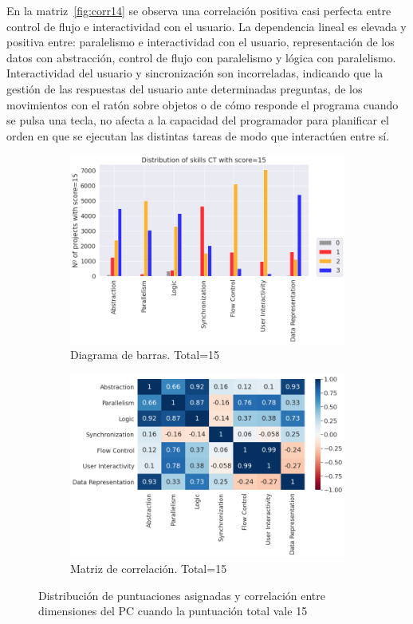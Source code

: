 \documentclass[a4paper, 12pt]{book}
\begin{document}
En la matriz~\ref{fig:corr14} se observa una correlación positiva casi perfecta entre control de flujo e interactividad con el usuario. La dependencia lineal es elevada y positiva entre: paralelismo e interactividad con el usuario, representación de los datos con abstracción, control de flujo con paralelismo y lógica con paralelismo. Interactividad del usuario y sincronización son incorreladas, indicando que la gestión de las respuestas del usuario ante determinadas preguntas, de los movimientos con el ratón sobre objetos o de cómo responde el programa cuando se pulsa una tecla, no afecta a la capacidad del programador para planificar el orden en que se ejecutan las distintas tareas de modo que interactúen entre sí.%

\begin{figure}[H]
    \centering
    \begin{subfigure}[h]{.49\textwidth} 
        \includegraphics[width=\textwidth]{img/distribucion_15_Scratch}
        \caption{Diagrama de barras. Total=15}
        \label{fig:total15}
    \end{subfigure}       
    \begin{subfigure}[h]{.49\textwidth} 
        \includegraphics[width=\textwidth]{img/corr_15_Scratch}
        \caption{Matriz de correlación. Total=15}
        \label{fig:corr15}
    \end{subfigure}
     \caption{Distribución de puntuaciones asignadas y correlación entre dimensiones del PC cuando la puntuación total vale 15}
\end{figure}
\end{document}
